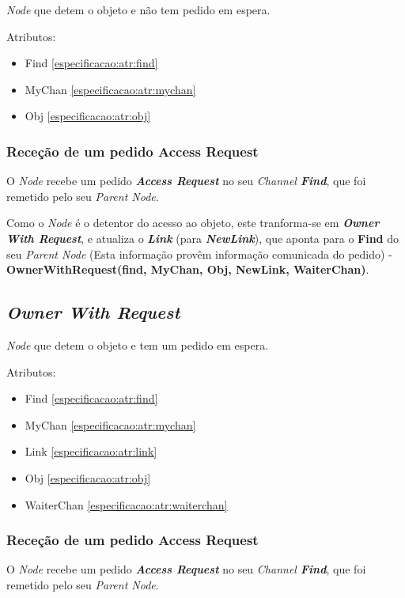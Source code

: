 \emph{Node} que detem o objeto e não tem pedido em espera.

Atributos:
\begin{itemize}
    \item Find \ref{especificacao:atr:find} 
    \item MyChan \ref{especificacao:atr:mychan} 
    \item Obj \ref{especificacao:atr:obj} 
\end{itemize}


\subsubsection{Receção de um pedido Access Request}
O \emph{Node} recebe um pedido \emph{\textbf{Access Request}} no seu \emph{Channel \textbf{Find}}, que foi remetido pelo seu \emph{Parent Node}.


Como o \emph{Node} é o detentor do acesso ao objeto, este tranforma-se em \emph{\textbf{Owner With Request}}, e atualiza o \textbf{\emph{Link}} (para \textbf{\emph{NewLink}}), que aponta para o \textbf{Find} do seu \emph{Parent Node} (Esta informação provêm informação comunicada do pedido) -\textbf{ OwnerWithRequest(find, MyChan, Obj, NewLink, WaiterChan)}.




\subsection{\emph{Owner With Request}}
\label{especificacao:nodes:owner_with_request}

\emph{Node} que detem o objeto e tem um pedido em espera.

Atributos:
\begin{itemize}
    \item Find \ref{especificacao:atr:find} 
    \item MyChan \ref{especificacao:atr:mychan} 
    \item Link \ref{especificacao:atr:link} 
    \item Obj \ref{especificacao:atr:obj} 
    \item WaiterChan \ref{especificacao:atr:waiterchan} 
\end{itemize}

\subsubsection{Receção de um pedido Access Request}
O \emph{Node} recebe um pedido \emph{\textbf{Access Request}} no seu \emph{Channel \textbf{Find}}, que foi remetido pelo seu \emph{Parent Node}.

